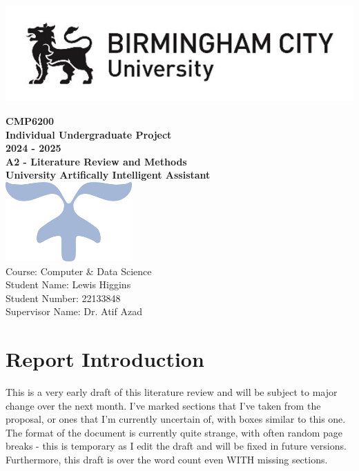 \documentclass[12pt]{report}
\begin{document}
    \makeatletter
    \begin{titlepage}
        \includegraphics[width=0.3\linewidth]{BCUWide.jpg}\\[4ex]
        \vspace{1cm}
        \begin{center}
            {\huge \bfseries  CMP6200}\\[2ex]
            {\huge \bfseries  Individual Undergraduate Project}\\[2ex]
            {\huge \bfseries 2024 - 2025}\\[6ex]
            {\large \bfseries A2 - Literature Review and Methods}\\[10ex]
            {\huge \bfseries University Artifically Intelligent Assistant}\\[6ex]
            \includegraphics[width=0.1\linewidth]{Symbol.png}\\[40ex]
            Course: Computer \& Data Science\\
            Student Name: Lewis Higgins\\
            Student Number: 22133848\\
            Supervisor Name: Dr. Atif Azad
        \end{center}
    \end{titlepage}
    \makeatother
    \thispagestyle{empty}
    \newpage

    \tableofcontents

    \chapter{Report Introduction}\label{ch:introduction}

    \begin{tcolorbox}[colback=orange!5!white,colframe=orange!75!black,title=Draft notice]
        This is a very early draft of this literature review and will be subject to major change
        over the next month. I've marked sections that I've taken from the proposal, or ones that 
        I'm currently uncertain of, with boxes similar to this one. The format of the document is currently 
        quite strange, with often random page breaks - this is temporary as I edit the draft and will be fixed in future versions.
        Furthermore, this draft is over the word count even WITH missing sections.
    \end{tcolorbox}
\end{document}
